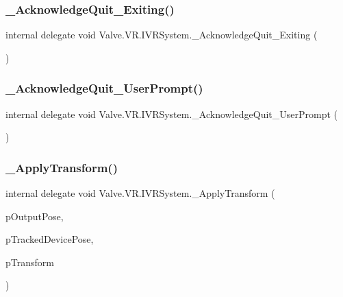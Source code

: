 \subsubsection{\texorpdfstring{\_AcknowledgeQuit\_Exiting()}{\_AcknowledgeQuit\_Exiting()}}
{\footnotesize\ttfamily internal delegate void Valve.\+V\+R.\+I\+V\+R\+System.\+\_\+\+Acknowledge\+Quit\+\_\+\+Exiting (\begin{DoxyParamCaption}{ }\end{DoxyParamCaption})}

\mbox{\label{struct_valve_1_1_v_r_1_1_i_v_r_system_a4309327757a4f929aeb20c09f12f16b4}} 
\subsubsection{\texorpdfstring{\_AcknowledgeQuit\_UserPrompt()}{\_AcknowledgeQuit\_UserPrompt()}}
{\footnotesize\ttfamily internal delegate void Valve.\+V\+R.\+I\+V\+R\+System.\+\_\+\+Acknowledge\+Quit\+\_\+\+User\+Prompt (\begin{DoxyParamCaption}{ }\end{DoxyParamCaption})}

\mbox{\label{struct_valve_1_1_v_r_1_1_i_v_r_system_a4b3c449999bda4d5effec48e5b5d6dfa}} 
\subsubsection{\texorpdfstring{\_ApplyTransform()}{\_ApplyTransform()}}
{\footnotesize\ttfamily internal delegate void Valve.\+V\+R.\+I\+V\+R\+System.\+\_\+\+Apply\+Transform (\begin{DoxyParamCaption}\item[{ref \mbox{\hyperlink{struct_valve_1_1_v_r_1_1_tracked_device_pose__t}{Tracked\+Device\+Pose\+\_\+t}}}]{p\+Output\+Pose,  }\item[{ref \mbox{\hyperlink{struct_valve_1_1_v_r_1_1_tracked_device_pose__t}{Tracked\+Device\+Pose\+\_\+t}}}]{p\+Tracked\+Device\+Pose,  }\item[{ref \mbox{\hyperlink{struct_valve_1_1_v_r_1_1_hmd_matrix34__t}{Hmd\+Matrix34\+\_\+t}}}]{p\+Transform }\end{DoxyParamCaption})}

